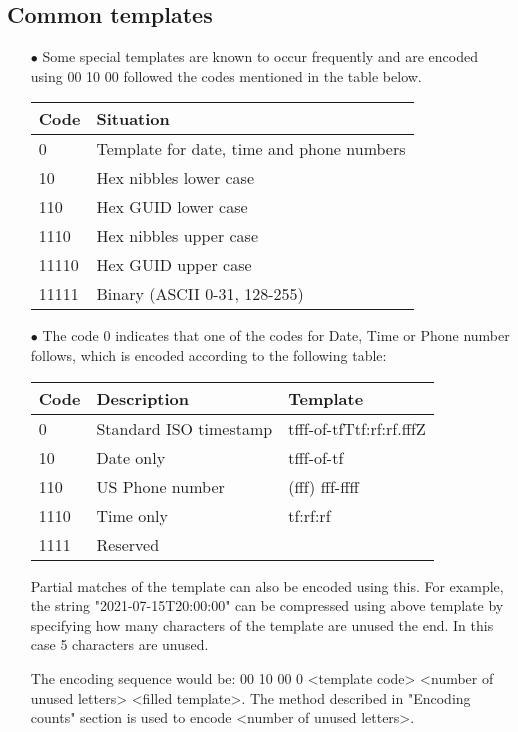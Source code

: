 \documentclass[]{article}
\begin{document}
\subsection{Common templates}
\begin{itemize}
	\item[$\bullet$] Some special templates are known to occur frequently and are encoded using 00 10 00 followed the codes mentioned in the table below.
	\item[] 
		\begin{tabular}{ | l | l |} \hline
		\textbf{Code} & \textbf{Situation} \\ \hline
		0 & Template for date, time and phone numbers \\ \hline
		10 & Hex nibbles lower case \\ \hline
		110 & Hex GUID lower case \\ \hline
		1110 & Hex nibbles upper case \\ \hline
		11110 & Hex GUID upper case \\ \hline
		11111 & Binary (ASCII 0-31, 128-255) \\ \hline
		\end{tabular}
	\item[$\bullet$] The code 0 indicates that one of the codes for Date, Time or Phone number follows, which is encoded according to the following table:
	\item[] 
		\begin{tabular}{ | l | l | l |} \hline
		\textbf{Code} & \textbf{Description} & \textbf{Template} \\ \hline
		0 & Standard ISO timestamp & tfff-of-tfTtf:rf:rf.fffZ \\ \hline
		10 & Date only & tfff-of-tf \\ \hline
		110 & US Phone number & (fff) fff-ffff \\ \hline
		1110 & Time only & tf:rf:rf \\ \hline
		1111 & Reserved \\ \hline
		\end{tabular}
	\item[]Partial matches of the template can also be encoded using this.  For example, the string "2021-07-15T20:00:00" can be compressed using above template by specifying how many characters of the template are unused the end. In this case 5 characters are unused.
	\item[]The encoding sequence would be: 00 10 00 0 <template code> <number of unused letters> <filled template>.  The method described in "Encoding counts" section is used to encode <number of unused letters>.

\end{itemize}
\end{document}
